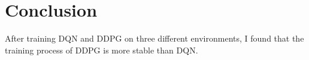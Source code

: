 \chapter{Conclusion}
\indent
	After training DQN and DDPG on three different environments, 
	I found that the training process of DDPG is more stable than DQN.
	